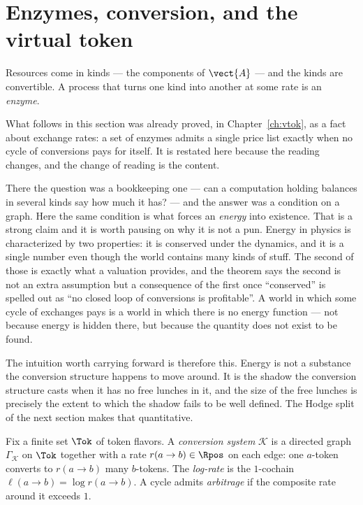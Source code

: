 \section{Enzymes, conversion, and the virtual token}

Resources come in kinds --- the components of $\vect{A}$ --- and the kinds
are convertible.  A process that turns one kind into another at some rate
is an \emph{enzyme}.

\begin{remark}
\label{rmk:vtok-twice}
What follows in this section was already proved, in
Chapter~\ref{ch:vtok}, as a fact about exchange rates: a set of enzymes
admits a single price list exactly when no cycle of conversions pays for
itself.
It is restated here because the reading changes, and the change of
reading is the content.

There the question was a bookkeeping one --- can a computation holding
balances in several kinds say how much it has? --- and the answer was a
condition on a graph.
Here the same condition is what forces an \emph{energy} into existence.
That is a strong claim and it is worth pausing on why it is not a pun.
Energy in physics is characterized by two properties: it is conserved
under the dynamics, and it is a single number even though the world
contains many kinds of stuff.
The second of those is exactly what a valuation provides, and the
theorem says the second is not an extra assumption but a consequence of
the first once ``conserved'' is spelled out as ``no closed loop of
conversions is profitable''.
A world in which some cycle of exchanges pays is a world in which there
is no energy function --- not because energy is hidden there, but
because the quantity does not exist to be found.

The intuition worth carrying forward is therefore this.
Energy is not a substance the conversion structure happens to move
around.
It is the shadow the conversion structure casts when it has no free
lunches in it, and the size of the free lunches is precisely the extent
to which the shadow fails to be well defined.
The Hodge split of the next section makes that quantitative.
\end{remark}

\begin{definition}
\label{def:conv}
Fix a finite set $\Tok$ of token flavors.  A \emph{conversion system}
$\mathcal{K}$ is a directed graph $\Gamma_{\mathcal K}$ on $\Tok$ together
with a rate $r(a \to b) \in \Rpos$ on each edge: one $a$-token converts to
$r(a\to b)$ many $b$-tokens.  The \emph{log-rate} is the $1$-cochain
$\ell(a \to b) = \log r(a\to b)$.  A cycle admits \emph{arbitrage} if the
composite rate around it exceeds $1$.
\end{definition}

